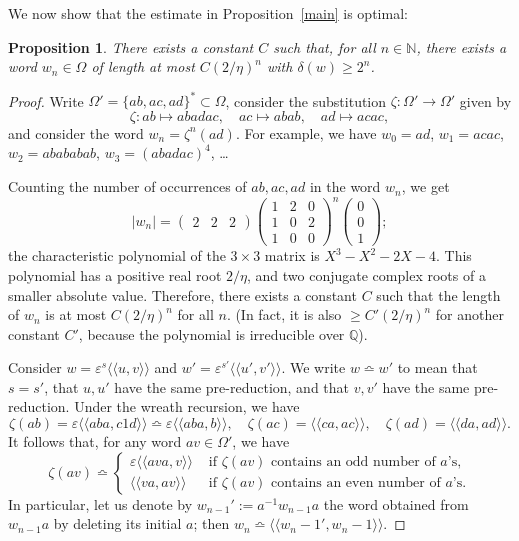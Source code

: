 \documentclass{amsart}
\newcommand\N{\mathbb{N}}
\def\pair<#1>{{\langle\!\langle}#1{\rangle\!\rangle}}
\newtheorem{proposition}[lemma]{Proposition}
\theoremstyle{definition}
\begin{document}
\noindent We now show that the estimate in Proposition~\ref{main} is optimal:
\begin{proposition}\label{substitution}
  There exists a constant $C$ such that, for all $n\in\N$, there
  exists a word $w_n\in \Omega$ of length at most $C(2/\eta)^n$ with
  $\delta(w)\ge 2^n$.
\end{proposition}
\begin{proof}
  Write $\Omega'=\{ab,ac,ad\}^*\subset \Omega$, consider the substitution
  $\zeta:\Omega'\to \Omega'$ given by
  \[\zeta:ab\mapsto abadac,\quad ac\mapsto abab,\quad ad\mapsto acac,\]
  and consider the word $w_n=\zeta^n(ad)$. For example, we have
  $w_0=ad$, $w_1=acac$, $w_2=abababab$,
  $w_3=(abadac)^4$, \dots
  
  Counting the number of occurrences of $ab,ac,ad$ in the word $w_n$,
  we get
  \[|w_n|=\begin{pmatrix}2 & 2 & 2\end{pmatrix}\begin{pmatrix}1 &
    2 & 0\\ 1 & 0 & 2\\ 1 & 0 & 0\end{pmatrix}^n\begin{pmatrix}0\\ 0\\
    1\end{pmatrix};\] the characteristic polynomial of the $3\times3$
  matrix is $X^3-X^2-2X-4$. This polynomial has a positive real root
  $2/\eta$, and two conjugate complex roots of a smaller absolute
  value. Therefore, there exists a constant $C$ such that the length
  of $w_n$ is at most $C(2/\eta)^n$ for all $n$. (In fact, it is also
  $\ge C'(2/\eta)^n$ for another constant $C'$, because the polynomial
  is irreducible over $\mathbb Q$).

  Consider $w=\varepsilon^s\pair<u,v>$ and
  $w'=\varepsilon^{s'}\pair<u',v'>$. We write $w\bumpeq w'$ to mean
  that $s=s'$, that $u,u'$ have the same pre-reduction, and that
  $v,v'$ have the same pre-reduction.  Under the wreath recursion, we
  have
  \[\zeta(ab)=\varepsilon\pair<aba,c1d>\bumpeq\varepsilon\pair<aba,b>,\quad
  \zeta(ac)=\pair<ca,ac>,\quad \zeta(ad)=\pair<da,ad>.
  \]
  It follows that, for any word $av\in \Omega'$, we have
  \[\zeta(av)\bumpeq\begin{cases}\varepsilon\pair<ava,v> & \text{ if $\zeta(av)$ contains an odd number of $a$'s,}\\
    \pair<va,av> & \text{ if $\zeta(av)$ contains an even number of $a$'s.}
  \end{cases}
  \]
  In particular, let us denote by $w_{n-1}':=a^{-1}w_{n-1}a$ the word
  obtained from $w_{n-1}a$ by deleting its initial $a$; then
  $w_n\bumpeq\pair<w_{n-1}',w_{n-1}>$.


\end{proof}
\end{document}
